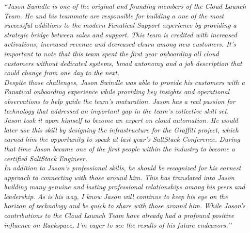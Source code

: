 \setlength\parindent{2em} \textit{
    ``Jason Swindle is one of the original and founding members of the Cloud Launch Team. He and his teammate are responsible for building a one of the most successful additions to the modern Fanatical Support experience by providing a strategic bridge between sales and support.  This team is credited with increased activations, increased revenue and decreased churn among new customers.  It’s important to note that this team spent the first year onboarding all cloud customers without dedicated systems, broad autonomy and a job description that could change from one day to the next.} \\[5pt]

\setlength\parindent{2em} \textit{
    Despite those challenges, Jason Swindle was able to provide his customers with a Fanatical onboarding experience while providing key insights and operational observations to help guide the team’s maturation.  Jason has a real passion for technology that addressed an important gap in the team’s collective skill set. Jason took it upon himself to become an expert on cloud automation. He would later use this skill by designing the infrastructure for the Graffiti project, which earned him the opportunity to speak at last year’s SaltStack Conference. During that time Jason became one of the first people within the industry to become a certified SaltStack Engineer.} \\[5pt]

\setlength\parindent{2em} \textit{
    In addition to Jason`s professional skills, he should be recognized for his earnest approach to connecting with those around him. This has translated into Jason building many genuine and lasting professional relationships among his peers and leadership.  As is his way, I know Jason will continue to keep his eye on the horizon of technology and be quick to share with those around him. While Jason’s contributions to the Cloud Launch Team have already had a profound positive influence on Rackspace, I’m eager to see the results of his future endeavors.''}
  \leavevmode \\[10pt]
